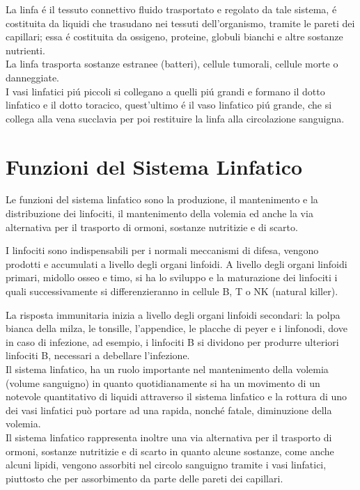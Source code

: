 La linfa \'e il tessuto connettivo fluido trasportato e regolato da tale sistema, \'e costituita 
da liquidi che trasudano nei tessuti dell'organismo, tramite le pareti dei capillari; essa \'e costituita 
da ossigeno, proteine, globuli bianchi e altre sostanze nutrienti.\\ 
La linfa trasporta sostanze estranee (batteri), cellule tumorali, cellule morte o danneggiate.\\ 
I vasi linfatici pi\'u piccoli si collegano a quelli pi\'u grandi e formano il dotto linfatico e il dotto 
toracico, quest'ultimo \'e il vaso linfatico pi\'u grande, che si collega alla vena succlavia per poi restituire 
la linfa alla circolazione sanguigna\cite{BOOK1}. \\

\section{Funzioni del Sistema Linfatico}
Le funzioni del sistema linfatico sono la produzione, il mantenimento e la distribuzione dei linfociti, 
il mantenimento della volemia ed anche la via alternativa per il trasporto di ormoni,
 sostanze nutritizie e di scarto\cite{BOOK1}.


 I linfociti sono indispensabili per i normali meccanismi di difesa, vengono prodotti e accumulati a livello 
 degli organi linfoidi. 
 A livello degli organi linfoidi primari, midollo osseo e timo, si ha lo sviluppo e la maturazione dei linfociti 
 i quali successivamente si differenzieranno in cellule B, T o NK (natural killer)\cite{BOOK1}.
  
 La risposta immunitaria inizia a livello degli organi linfoidi secondari: la polpa bianca della milza, le tonsille, 
 l’appendice, le placche di peyer e i linfonodi, dove in caso di infezione, ad esempio,
 i linfociti B si dividono per produrre ulteriori linfociti B, necessari a debellare l’infezione.\\

 Il sistema linfatico, ha un ruolo importante nel mantenimento della volemia (volume sanguigno) in quanto 
 quotidianamente si ha un movimento di un notevole quantitativo di liquidi attraverso il sistema linfatico e 
 la rottura di uno dei vasi linfatici può portare ad una rapida,
  nonché fatale, diminuzione della volemia\cite{BOOK1}.\\

  Il sistema linfatico rappresenta inoltre una via alternativa per il trasporto di ormoni, sostanze nutritizie e 
  di scarto in quanto alcune sostanze, come anche alcuni lipidi, vengono assorbiti nel circolo sanguigno tramite 
  i vasi linfatici, piuttosto che per assorbimento da parte delle pareti dei capillari\cite{BOOK1}.



